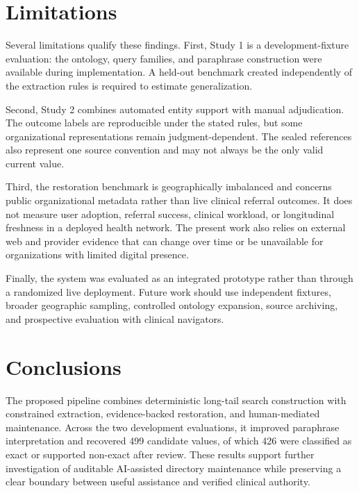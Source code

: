 \documentclass[journal,article,submit,moreauthors]{Definitions/mdpi}
\begin{document}
\section{Limitations}

Several limitations qualify these findings. First, Study 1 is a development-fixture evaluation: the ontology, query families, and paraphrase construction were available during implementation. A held-out benchmark created independently of the extraction rules is required to estimate generalization.

Second, Study 2 combines automated entity support with manual adjudication. The outcome labels are reproducible under the stated rules, but some organizational representations remain judgment-dependent. The sealed references also represent one source convention and may not always be the only valid current value.

Third, the restoration benchmark is geographically imbalanced and concerns public organizational metadata rather than live clinical referral outcomes. It does not measure user adoption, referral success, clinical workload, or longitudinal freshness in a deployed health network. The present work also relies on external web and provider evidence that can change over time or be unavailable for organizations with limited digital presence.

Finally, the system was evaluated as an integrated prototype rather than through a randomized live deployment. Future work should use independent fixtures, broader geographic sampling, controlled ontology expansion, source archiving, and prospective evaluation with clinical navigators.

\section{Conclusions}

The proposed pipeline combines deterministic long-tail search construction with constrained extraction, evidence-backed restoration, and human-mediated maintenance. Across the two development evaluations, it improved paraphrase interpretation and recovered 499 candidate values, of which 426 were classified as exact or supported non-exact after review. These results support further investigation of auditable AI-assisted directory maintenance while preserving a clear boundary between useful assistance and verified clinical authority.

\vspace{6pt} 
\end{document}
